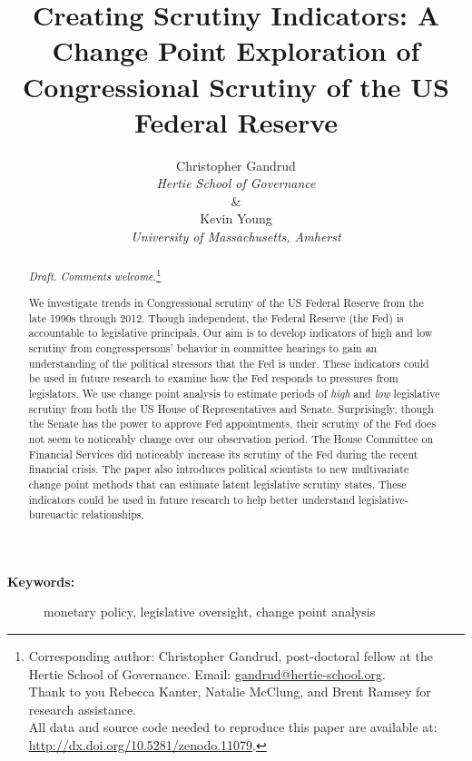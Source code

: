 \documentclass[a4paper]{article}\usepackage[]{graphicx}\usepackage[]{color}
\title{Creating Scrutiny Indicators: A Change Point Exploration of Congressional Scrutiny of the US Federal Reserve}
\author{Christopher Gandrud \\ {\emph{Hertie School of Governance}} \\ \& \\ Kevin Young \\ {\emph{University of Massachusetts, Amherst}}}
\begin{document}
\maketitle

\begin{abstract}

\noindent\emph{Draft. Comments welcome.}\footnote{Corresponding author: Christopher Gandrud, post-doctoral fellow at the Hertie School of Governance. Email: \href{mailto:gandrud@hertie-school.org}{gandrud@hertie-school.org}. \\ Thank to you Rebecca Kanter, Natalie McClung, and Brent Ramsey for research assistance. \\
All data and source code needed to reproduce this paper are available at: \url{http://dx.doi.org/10.5281/zenodo.11079}.}

We investigate trends in Congressional scrutiny of the US Federal Reserve from the late 1990s through 2012. Though independent, the Federal Reserve (the Fed) is accountable to legislative principals. Our aim is to develop indicators of high and low scrutiny from congresspersons' behavior in committee hearings to gain an understanding of the political stressors that the Fed is under. These indicators could be used in future research to examine how the Fed responds to pressures from legislators. We use change point analysis to estimate periods of \emph{high} and \emph{low} legislative scrutiny from both the US House of Representatives and Senate. Surprisingly, though the Senate has the power to approve Fed appointments, their scrutiny of the Fed does not seem to noticeably change over our observation period. The House Committee on Financial Services did noticeably increase its scrutiny of the Fed during the recent financial crisis. The paper also introduces political scientists to new multivariate change point methods that can estimate latent legislative scrutiny states. These indicators could be used in future research to help better understand legislative-bureuactic relationships.

\end{abstract}

\begin{description}
  \item [{\textbf{Keywords:}}] monetary policy, legislative oversight, change point analysis
\end{description}
\end{document}
